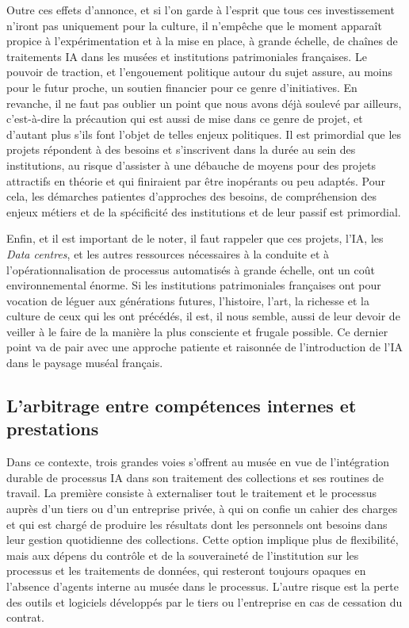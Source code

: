 Outre ces effets d'annonce, et si l'on garde à l'esprit que tous ces investissement n'iront pas uniquement pour la culture, il n'empêche que le moment apparaît propice à l'expérimentation et à la mise en place, à grande échelle, de chaînes de traitements IA dans les musées et institutions patrimoniales françaises. Le pouvoir de traction, et l'engouement politique autour du sujet assure, au moins pour le futur proche, un soutien financier pour ce genre d'initiatives. En revanche, il ne faut pas oublier un point que nous avons déjà soulevé par ailleurs, c'est-à-dire la précaution qui est aussi de mise dans ce genre de projet, et d'autant plus s'ils font l’objet de telles enjeux politiques. Il est primordial que les projets répondent à des besoins et s'inscrivent dans la durée au sein des institutions, au risque d'assister à une débauche de moyens pour des projets attractifs en théorie et qui finiraient par être inopérants ou peu adaptés. Pour cela, les démarches patientes d'approches des besoins, de compréhension des enjeux métiers et de la spécificité des institutions et de leur passif est primordial. 

Enfin, et il est important de le noter, il faut rappeler que ces projets, l'IA, les \textit{Data centres}, et les autres ressources nécessaires à la conduite et à l'opérationnalisation de processus automatisés à grande échelle, ont un coût environnemental énorme. Si les institutions patrimoniales françaises ont pour vocation de léguer aux générations futures, l'histoire, l'art, la richesse et la culture de ceux qui les ont précédés, il est, il nous semble, aussi de leur devoir de veiller à le faire de la manière la plus consciente et frugale possible. Ce dernier point va de pair avec une approche patiente et raisonnée de l'introduction de l'IA dans le paysage muséal français.

\subsection{L'arbitrage entre compétences internes et prestations}

Dans ce contexte, trois grandes voies s'offrent au musée en vue de l'intégration durable de processus IA dans son traitement des collections et ses routines de travail. La première consiste à externaliser tout le traitement et le processus auprès d'un tiers ou d'un entreprise privée, à qui on confie un cahier des charges et qui est chargé de produire les résultats dont les personnels ont besoins dans leur gestion quotidienne des collections. Cette option implique plus de flexibilité, mais aux dépens du contrôle et de la souveraineté de l'institution sur les processus et les traitements de données, qui resteront toujours opaques en l'absence d'agents interne au musée dans le processus. L'autre risque est la perte des outils et logiciels développés par le tiers ou l'entreprise en cas de cessation du contrat.

